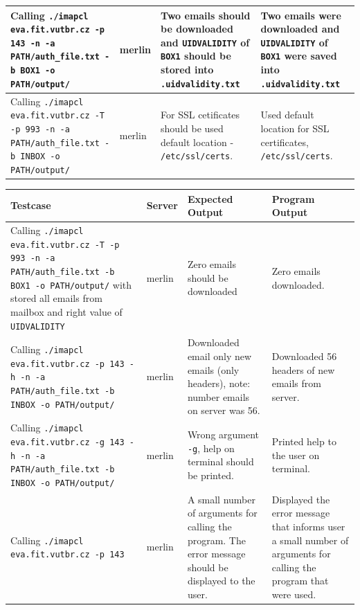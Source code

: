 \documentclass[a4paper,11pt]{article}
\begin{document}
\begin{center}
\begin{tabularx}{\textwidth}{|>{\raggedright\arraybackslash}p{5cm}|>{\raggedright\arraybackslash}p{1cm}|>{\raggedright\arraybackslash}p{5cm}|>{\raggedright\arraybackslash}X|}
        \hline
        Calling \texttt{./imapcl eva.fit.vutbr.cz -p 143 -n -a PATH/auth\_file.txt -b BOX1 -o PATH/output/} & merlin & Two emails should be downloaded and \texttt{UIDVALIDITY} of \texttt{BOX1} should be stored into \texttt{.uidvalidity.txt} & Two emails were downloaded and \texttt{UIDVALIDITY} of \texttt{BOX1} were saved into \texttt{.uidvalidity.txt} \\
        \hline
        Calling \texttt{./imapcl eva.fit.vutbr.cz -T -p 993 -n -a PATH/auth\_file.txt -b INBOX -o PATH/output/} & merlin & For SSL cetificates should be used default location - \texttt{/etc/ssl/certs}. & Used default location for SSL certificates, \texttt{/etc/ssl/certs}. \\
        \hline
    \end{tabularx}
    \vspace{0.5cm} %
\end{center}

\begin{center}
    \vspace{0.5cm} %
    \begin{tabularx}{\textwidth}{|>{\raggedright\arraybackslash}p{5cm}|>{\raggedright\arraybackslash}p{1cm}|>{\raggedright\arraybackslash}p{5cm}|>{\raggedright\arraybackslash}X|}
        \hline
        \textbf{Testcase} & \textbf{Server} & \textbf{Expected Output} & \textbf{Program Output} \\
        \hline
        Calling \texttt{./imapcl eva.fit.vutbr.cz -T -p 993 -n -a PATH/auth\_file.txt -b BOX1 -o PATH/output/} with stored all emails from mailbox and right value of \texttt{UIDVALIDITY} & merlin & Zero emails should be downloaded & Zero emails downloaded. \\
        \hline
        Calling \texttt{./imapcl eva.fit.vutbr.cz -p 143 -h -n -a PATH/auth\_file.txt -b INBOX -o PATH/output/} & merlin & Downloaded email only new emails (only headers), note: number emails on server was 56. & Downloaded 56 headers of new emails from server. \\
        \hline
        Calling \texttt{./imapcl eva.fit.vutbr.cz -g 143 -h -n -a PATH/auth\_file.txt -b INBOX -o PATH/output/} & merlin & Wrong argument \texttt{-g}, help on terminal should be printed. & Printed help to the user on terminal. \\
        \hline
        Calling \texttt{./imapcl eva.fit.vutbr.cz -p 143} & merlin & A small number of arguments for calling the program. The error message should be displayed to the user. & Displayed the error message that informs user a small number of arguments for calling the program that were used.\\
        \hline
    \end{tabularx}
    \vspace{0.5cm} %
\end{center}
\end{document}

